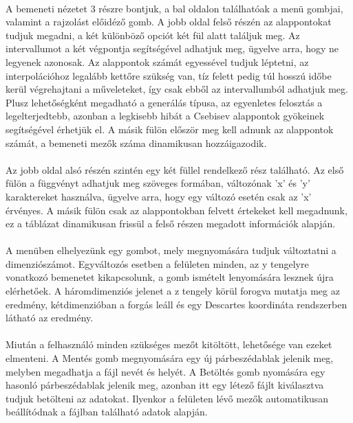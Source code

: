 \documentclass[12pt]{report}
\begin{document}
\paragraph{}
A bemeneti nézetet 3 részre bontjuk, a bal oldalon találhatóak a menü gombjai, valamint a rajzolást előidéző gomb. A jobb oldal felső részén az alappontokat tudjuk megadni, a két különböző opciót két fül alatt találjuk meg. Az intervallumot a két végpontja segítségével adhatjuk meg, ügyelve arra, hogy ne legyenek azonosak. Az alappontok számát egyessével tudjuk léptetni, az interpolációhoz legalább kettőre szükség van, tíz felett pedig túl hosszú időbe kerül végrehajtani a műveleteket, így csak ebből az intervallumból adhatjuk meg. Plusz lehetőségként megadható a generálás típusa, az egyenletes felosztás a legelterjedtebb, azonban a legkisebb hibát a Csebisev alappontok gyökeinek segítségével érhetjük el. A másik fülön először meg kell adnunk az alappontok számát, a bemeneti mezők száma dinamikusan hozzáigazodik.
\paragraph{}
Az jobb oldal alsó részén szintén egy két füllel rendelkező rész található. Az első fülön a függvényt adhatjuk meg szöveges formában, változónak 'x' és 'y' karaktereket használva, ügyelve arra, hogy egy változó esetén csak az 'x' érvényes. A másik fülön csak az alappontokban felvett értekeket kell megadnunk, ez a táblázat dinamikusan frissül a felső részen megadott információk alapján.
\paragraph{}
A menüben elhelyezünk egy gombot, mely megnyomására tudjuk változtatni a dimenziószámot. Egyváltozós esetben a felületen minden, az y tengelyre vonatkozó bemenetet kikapcsolunk, a gomb ismételt lenyomására lesznek újra elérhetőek. A háromdimenziós jelenet a z tengely körül forogva mutatja meg az eredmény, kétdimenzióban a forgás leáll és egy Descartes koordináta rendszerben látható az eredmény.
\paragraph{}
Miután a felhasználó minden szükséges mezőt kitöltött, lehetősége van ezeket elmenteni. A Mentés gomb megnyomására egy új párbeszédablak jelenik meg, melyben megadhatja a fájl nevét és helyét. A Betöltés gomb nyomására egy hasonló párbeszédablak jelenik meg, azonban itt egy létező fájlt kiválasztva tudjuk betölteni az adatokat. Ilyenkor a felületen lévő mezők automatikusan beállítódnak a fájlban található adatok alapján.
\end{document}
